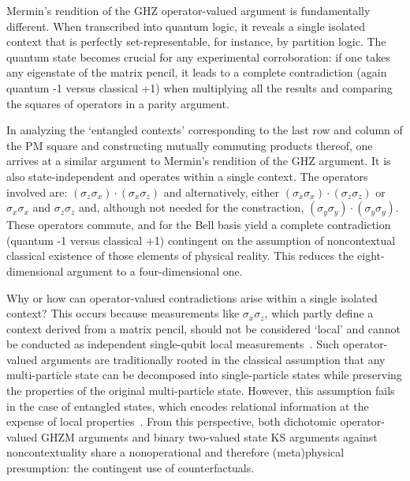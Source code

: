 \documentclass[
  twocolumn,
 showpacs,
 showkeys,
 preprintnumbers,
 amsmath,amssymb,
 aps,
 pra,
  longbibliography,
 floatfix,
 ]{revtex4-2}
\newcommand\myotimes{ }
\begin{document}
Mermin's rendition of the GHZ operator-valued argument is fundamentally different. When transcribed into quantum logic, it reveals a single isolated context that is perfectly set-representable, for instance, by partition logic. The quantum state becomes crucial for any experimental corroboration: if one takes any eigenstate of the matrix pencil, it leads to a complete contradiction (again quantum -1 versus classical +1) when multiplying all the results and comparing the squares of operators in a parity argument.

In analyzing the `entangled contexts' corresponding to the last row and column of the PM square and constructing
mutually commuting products thereof, one arrives at a similar argument to Mermin's rendition of the GHZ argument.
It is also state-independent and operates within a single context. The operators involved are:
$
(\sigma_z \myotimes \sigma_x) \cdot (\sigma_x \myotimes \sigma_z)
$  and alternatively, either
$
(\sigma_x\myotimes \sigma_x) \cdot (\sigma_z\myotimes \sigma_z)
$
or
$
\sigma_x\myotimes \sigma_x
$
and
$\sigma_z\myotimes \sigma_z
$
and, although not needed for the constraction,
$(\sigma_y \myotimes \sigma_y) \cdot (\sigma_y\myotimes \sigma_y)$.
These operators commute, and for the Bell basis yield a complete contradiction (quantum -1 versus classical +1)
contingent on the assumption of noncontextual classical existence of those elements of physical reality.
This reduces the eight-dimensional argument to a four-dimensional one.


Why or how can operator-valued contradictions arise within a single isolated context?
This occurs because measurements like \(\sigma_x \myotimes \sigma_z \),
which partly define a context derived from a matrix pencil,
should not be considered `local' and cannot be conducted as independent single-qubit local measurements~\cite{cabello2021contextuality}.
Such operator-valued arguments are traditionally rooted in the classical assumption that any multi-particle state
can be decomposed into single-particle states while preserving the properties of the original multi-particle state.
However, this assumption fails in the case of entangled states,
which encodes relational information at the expense of local properties~\cite{zeil-99}.
From this perspective, both dichotomic operator-valued GHZM
arguments and binary two-valued state KS arguments against noncontextuality share a nonoperational and therefore
(meta)physical presumption: the contingent use of counterfactuals.
\end{document}
